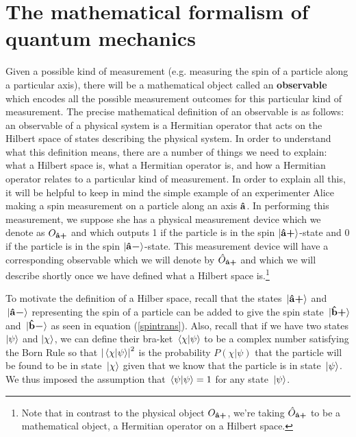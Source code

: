 \section{The mathematical formalism of quantum mechanics}
Given a possible kind of measurement (e.g. measuring the spin of a particle along a particular axis), there will be a mathematical object called an \textbf{observable} which encodes all the possible measurement outcomes for this particular kind of measurement. The precise mathematical definition of an observable is as follows: an observable of a physical system is a Hermitian operator that acts on the Hilbert space of states describing the physical system. In order to understand what this definition means, there are a number of things we need to explain: what a Hilbert space is, what a Hermitian operator is, and how a Hermitian operator relates to a particular kind of measurement. In order to explain all this, it will be helpful to keep in mind the simple example of an experimenter Alice making a spin measurement on a particle along an axis $\vb{\hat{{a}}}$. In performing this measurement, we suppose she has a physical measurement device which we denote as $O_{\vb{\hat{{a}}}\bm{+}}$ and which outputs 1 if the particle is in the spin $\ket{\vb{\hat{{a}}}\bm{+}}$-state and 0 if the particle is in the spin $\ket{\vb{\hat{{a}}}\bm{-}}$-state. This measurement device will have a corresponding observable which we will denote by $\hat{O}_{\vb{\hat{{a}}}\bm{+}}$ and which we will describe shortly once we have defined what a Hilbert space is.\footnote{Note that in contrast to the physical object $O_{\vb{\hat{{a}}}\bm{+}}$, we're taking $\hat{O}_{\vb{\hat{{a}}}\bm{+}}$ to be a mathematical object, a Hermitian operator on a Hilbert space.} 

To motivate the definition of a Hilber space, recall that the states $\ket*{\vb{\hat{{a}}}\bm{+}}$ and $\ket*{\vb{\hat{{a}}}\bm{-}}$ representing the spin of  a particle can be added to give the spin state $\ket*{\vb{\hat{{b}}}\bm{+}}$ and $\ket*{\vb{\hat{{b}}}\bm{-}}$ as seen in equation (\ref{spintrans}). Also, recall that if we have two states $\ket{\psi}$ and $\ket{\chi}$, we can define their bra-ket $\ip*{\chi}{\psi}$ to be a complex number satisfying the Born Rule so that $\abs{\ip*{\chi}{\psi}}^2$ is the probability $P(\chi|\psi)$ that the particle will be found to be in state $\ket*{\chi}$ given that we know that the particle is in state $\ket*{\psi}$. We thus imposed the assumption that  $\ip*{\psi}{\psi}=1$ for any state $\ket*{\psi}$. 

